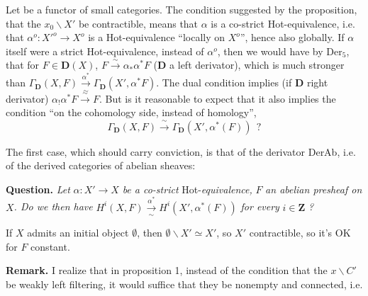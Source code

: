 Let  be a functor of small categories. The condition suggested by the proposition, that the $x_0\backslash X'$ be contractible, means that $\alpha$ is a co-strict Hot-equivalence, i.e. that $\alpha^{o} : X'^{o} \longrightarrow X^{o}$ is a Hot-equivalence ``locally on $X^{o}$'', hence also globally. If $\alpha$
itself were a strict Hot-equivalence, instead of $\alpha^{o}$, then we would have by $\mathrm{Der}_5$, that for $F \in \mathbf{D}(X)$, $F \xrightarrow{\;\sim\;} \alpha_*\alpha^* F$ ($\mathbf{D}$ a left derivator), which is much stronger than $\Gamma_{\mathbf{D}}(X, F) \xrightarrow[\sim]{\alpha^*} \Gamma_{\mathbf{D}}(X', \alpha^* F)$. The dual condition implies (if $\mathbf{D}$ right derivator) $\alpha_!\alpha^* F \xrightarrow{\;\sim\;} F$. But is it reasonable to expect that it also implies the condition ``on the cohomology side, instead of homology'',
\[ \Gamma_{\mathbf{D}}(X, F) \xrightarrow{\;\sim\;} \Gamma_{\mathbf{D}}(X', \alpha^*(F)) \ \ ? \]

The first case, which should carry conviction, is that of the derivator DerAb, i.e. of the derived categories of abelian sheaves:

\textbf{Question.} \textit{Let} $\alpha : X' \longrightarrow X$ \textit{be a co-strict} Hot-\textit{equivalence,} $F$ \textit{an abelian presheaf on} $X$\textit{. Do we then have} $H^i(X, F) \xrightarrow[\sim]{\alpha^*} H^i(X', \alpha^*(F))$ \textit{for every} $i \in \mathbf{Z}$ \textit{?}

If $X$ admits an initial object $\emptyset$, then $\emptyset\backslash X' \simeq X'$, so $X'$ contractible, so it's OK for $F$ constant.

\textbf{Remark.} I realize that in proposition 1, instead of the condition that the $x\backslash C'$ be weakly left filtering, it would suffice that they be nonempty and connected, i.e.